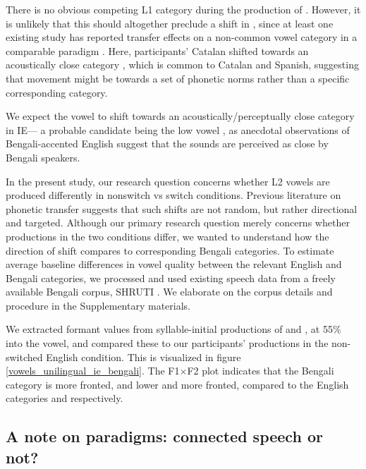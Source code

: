 \documentclass[12 pt]{article}
\newcommand{\nt}[1]{\textipa{[#1]}} %
\begin{document}

There is no obvious competing L1 category during the production of \nt{2}. However, it is unlikely that this should altogether preclude a shift in \nt{2}, since at least one existing study has reported transfer effects on a non-common vowel category in a comparable paradigm \citep{simonet2014phonetic}. Here, participants' Catalan \nt{O} shifted towards an acoustically close category \nt{o}, which is common to Catalan and Spanish, suggesting that movement might be towards a set of phonetic norms rather than a specific corresponding category. 

We expect the vowel \nt{2} to shift towards an acoustically/perceptually close category in IE--- a probable candidate being the low vowel \nt{a:}, as anecdotal observations of Bengali-accented English suggest that the sounds are perceived as close by Bengali speakers. 


In the present study, our research question concerns whether L2 vowels are produced differently in nonswitch vs switch conditions. Previous literature on phonetic transfer suggests that such shifts are not random, but rather directional and targeted. Although our primary research question merely concerns whether productions in the two conditions differ, we wanted to understand how the direction of shift compares to corresponding Bengali categories. To estimate average baseline differences in vowel quality between the relevant English and Bengali categories, we processed and used existing speech data from a freely available Bengali corpus, SHRUTI \citep{shruticorpus}. We elaborate on the corpus details and procedure in the Supplementary materials.

We extracted formant values from syllable-initial productions of \nt{\ae} and \nt{a:}, at 55\% into the vowel, and compared these to our participants' productions in the non-switched English condition. This is visualized in figure \ref{vowels_unilingual_ie_bengali}. 
The F1$\times$F2 plot indicates that the Bengali category \nt{\ae} is more fronted, and \nt{a:} lower and more fronted, compared to the English categories \nt{\ae} and \nt{2} respectively. 

\subsection{A note on paradigms: connected speech or not?} \label{paradigms}
\end{document}
